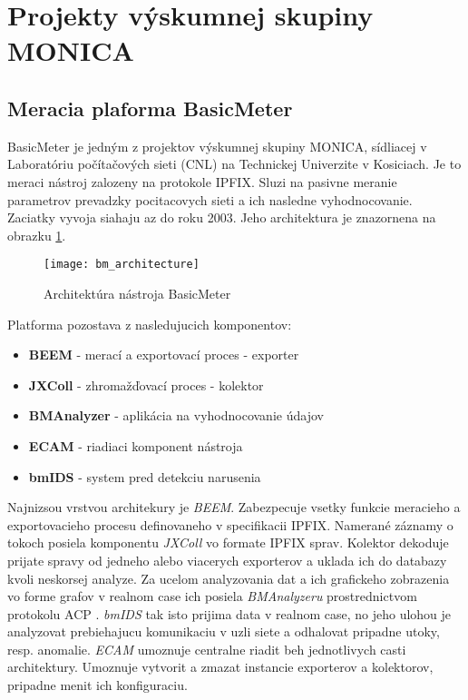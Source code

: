 \section{Projekty v\'yskumnej skupiny MONICA}

\subsection{Meracia plaforma BasicMeter}

BasicMeter \citep{monica} je jedným z projektov výskumnej 
skupiny MONICA, sídliacej v Laboratóriu počítačových sieti (CNL) na Technickej Univerzite v Kosiciach. 
Je to meraci nástroj zalozeny na protokole IPFIX. Sluzi na pasivne meranie parametrov prevadzky 
pocitacovych sieti a ich nasledne vyhodnocovanie. Zaciatky vyvoja siahaju az do roku 2003. Jeho 
architektura je znazornena na obrazku \ref{o:bm_architecture}.

\begin{figure}[ht!]
\centering
\texttt{[image: bm\_architecture]}
\caption{Architektúra nástroja BasicMeter \citep{ja}}\label{o:bm_architecture}
\end{figure}

Platforma pozostava z nasledujucich komponentov:
\begin{itemize}
 \item \textbf{BEEM} - merací a exportovací proces - exporter
 \item \textbf{JXColl} - zhromažďovací proces - kolektor
 \item \textbf{BMAnalyzer} - aplikácia na vyhodnocovanie údajov
 \item \textbf{ECAM} - riadiaci komponent nástroja
 \item \textbf{bmIDS} - system pred detekciu narusenia
\end{itemize}

Najnizsou vrstvou architekury je \emph{BEEM}. Zabezpecuje vsetky funkcie 
meracieho a exportovacieho procesu definovaneho v specifikacii IPFIX. Namerané záznamy o tokoch
posiela komponentu \emph{JXColl} vo formate IPFIX sprav. Kolektor dekoduje prijate spravy od jedneho
alebo viacerych exporterov a uklada ich do databazy kvoli neskorsej analyze. Za ucelom analyzovania dat
a ich grafickeho zobrazenia vo forme grafov v realnom case ich posiela \emph{BMAnalyzeru} prostrednictvom 
protokolu ACP \citep{ado}. \emph{bmIDS} tak isto prijima data v realnom case, no jeho ulohou je analyzovat
prebiehajucu komunikaciu v uzli siete a odhalovat pripadne utoky, resp. anomalie. \emph{ECAM} umoznuje 
centralne riadit beh jednotlivych casti architektury. Umoznuje vytvorit a zmazat instancie exporterov 
a kolektorov, pripadne menit ich konfiguraciu. \citep{ja, veri}

